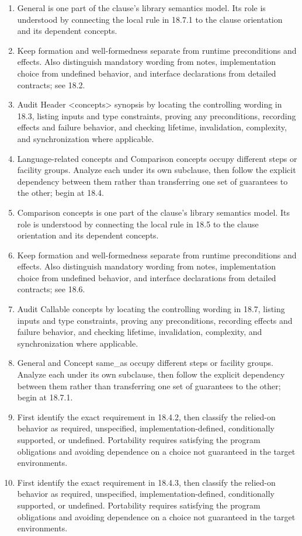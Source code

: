 \documentclass[11pt,letterpaper]{article}
\begin{document}
\begin{enumerate}
\item General is one part of the clause's library semantics model. Its role is understood by connecting the local rule in 18.7.1 to the clause orientation and its dependent concepts.
\item Keep formation and well-formedness separate from runtime preconditions and effects. Also distinguish mandatory wording from notes, implementation choice from undefined behavior, and interface declarations from detailed contracts; see 18.2.
\item Audit Header <concepts> synopsis by locating the controlling wording in 18.3, listing inputs and type constraints, proving any preconditions, recording effects and failure behavior, and checking lifetime, invalidation, complexity, and synchronization where applicable.
\item Language-related concepts and Comparison concepts occupy different steps or facility groups. Analyze each under its own subclause, then follow the explicit dependency between them rather than transferring one set of guarantees to the other; begin at 18.4.
\item Comparison concepts is one part of the clause's library semantics model. Its role is understood by connecting the local rule in 18.5 to the clause orientation and its dependent concepts.
\item Keep formation and well-formedness separate from runtime preconditions and effects. Also distinguish mandatory wording from notes, implementation choice from undefined behavior, and interface declarations from detailed contracts; see 18.6.
\item Audit Callable concepts by locating the controlling wording in 18.7, listing inputs and type constraints, proving any preconditions, recording effects and failure behavior, and checking lifetime, invalidation, complexity, and synchronization where applicable.
\item General and Concept same\_\allowbreak{}as occupy different steps or facility groups. Analyze each under its own subclause, then follow the explicit dependency between them rather than transferring one set of guarantees to the other; begin at 18.7.1.
\item First identify the exact requirement in 18.4.2, then classify the relied-on behavior as required, unspecified, implementation-defined, conditionally supported, or undefined. Portability requires satisfying the program obligations and avoiding dependence on a choice not guaranteed in the target environments.
\item First identify the exact requirement in 18.4.3, then classify the relied-on behavior as required, unspecified, implementation-defined, conditionally supported, or undefined. Portability requires satisfying the program obligations and avoiding dependence on a choice not guaranteed in the target environments.
\end{enumerate}
\end{document}
